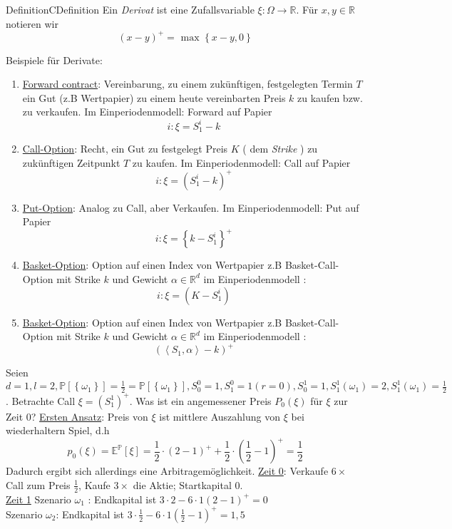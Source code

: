 \documentclass[11.5 pt, a4paper]{memoir}
\begin{document}
\begin{ibox}[3.1]{Definition}{CDefinition}
    Ein \textit{Derivat} ist eine Zufallsvariable $ \xi : \Omega \to \mathbb{R} $. Für $ x, y \in \mathbb{R} $ notieren wir 
		$$ \left( x - y \right)^{+} = \text{ max } \left\{ x - y, 0 \right\}  $$
\end{ibox}

Beispiele für Derivate:                                                                                              
\begin{enumerate}[label=\alph*)]
	\item \underline{Forward contract}: Vereinbarung, zu einem zukünftigen, festgelegten Termin $ T $ ein Gut (z.B Wertpapier) zu einem heute vereinbarten Preis $ k $ zu kaufen bzw. zu verkaufen. Im Einperiodenmodell: Forward auf Papier
		$$ i: \xi = S_1^{i} - k  $$
	\item \underline{Call-Option}: Recht, ein Gut zu festgelegt Preis $ K $ ( dem \textit{Strike} ) zu zukünftigen Zeitpunkt $T$ zu kaufen.
		Im Einperiodenmodell: Call auf Papier 
		$$ i : \xi = \left( S_1^{i} - k \right) ^{+} $$
	\item \underline{Put-Option}: Analog zu Call, aber Verkaufen. Im Einperiodenmodell: Put auf Papier
		$$ i : \xi = \left\{ k - S_1^{i} \right\} ^{+} $$
	\item \underline{Basket-Option}: Option auf einen Index von Wertpapier z.B Basket-Call-Option mit Strike $ k $ und Gewicht
		$ \alpha \in \mathbb{R}^{d} $ im Einperiodenmodell :
		$$ i : \xi = \left( K - S_1^{i} \right)  $$
	\item \underline{Basket-Option}: Option auf einen Index von Wertpapier z.B Basket-Call-Option mit Strike $ k $ und Gewicht $ \alpha
		\in \mathbb{R}^{d}$ im Einperiodenmodell :
		$$ \left(  \left< S_1, \alpha \right> - k \right) ^{+} $$
\end{enumerate}
Seien $ d = 1, l =2, \mathbb{P} \left[ \left\{ \omega_1 \right\}  \right] = \frac{1}{2} = \mathbb{P} \left[ \left\{ \omega_1 \right\}  \right] , S_0^{0} = 1, S_1^{0} = 1 (r=0), S_0^{1} = 1, S_1^{1}\left( \omega_1 \right) = 2, S_1^{1} (\omega_1) = \frac{1}{2}  $.
Betrachte Call $ \xi = \left( S_1^{1} \right)^{+} $. Was ist ein angemessener Preis $ P_0 (\xi) $ für $ \xi $ zur Zeit 0? \break
\underline{Ersten Ansatz}: Preis von $ \xi $ ist mittlere Auszahlung von $ \xi $ bei wiederhaltern Spiel, d.h 
$$ p_0 (\xi) = \mathbb{E} ^{ \mathbb{P} } \left[ \xi \right] = \frac{1}{2} \cdot \left( 2 - 1 \right)^{+} + \frac{1}{2} \cdot 
\left( \frac{1}{2} -1 \right)^{+} = \frac{1}{2}  $$
Dadurch ergibt sich allerdings eine Arbitragemöglichkeit.
\break 
\underline{Zeit 0}: Verkaufe $ 6 \times $ Call zum Preis $ \frac{1}{2}  $, Kaufe $ 3 \times $ die Aktie; Startkapital 0. \\
\underline{Zeit 1} Szenario $ \omega_1 $ : Endkapital ist $ 3 \cdot 2 - 6 \cdot 1 (2-1)^{+} = 0 $ \\
Szenario $ \omega_2 $: Endkapital ist $ 3 \cdot \frac{1}{2} - 6 \cdot 1 \left( \frac{1}{2} - 1 \right) ^{+} = 1,5 $ 
\end{document}
